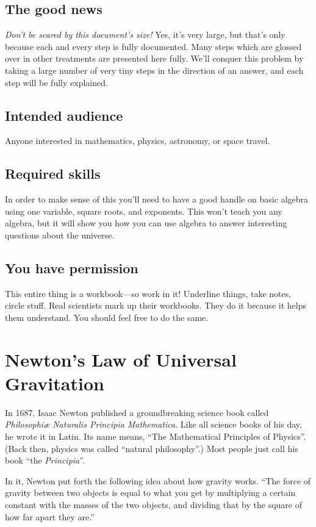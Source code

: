 \documentclass[10pt,letterpaper]{report}
\begin{document}
\subsection{The good news}
\textit{Don't be scared by this document's size!}  Yes, it's very
large, but that's only because each and every step is fully
documented.  Many steps which are glossed over in other treatments are
presented here fully.  We'll conquer this problem by taking a large
number of very tiny steps in the direction of an answer, and each step
will be fully explained.

\subsection{Intended audience}
Anyone interested in mathematics, physics, astronomy, or space
travel.

\subsection{Required skills}
In order to make sense of this you'll need to have a good handle on
basic algebra using one variable, square roots, and exponents.  This
won't teach you any algebra, but it will show you how you can use
algebra to answer interesting questions about the universe.

\subsection{You have permission}
This entire thing is a workbook---so work in it!  Underline things, take
notes, circle stuff.  Real scientists mark up their workbooks.  They
do it because it helps them understand.  You should feel free to do
the same.

\section{Newton's Law of Universal Gravitation}

In 1687, Isaac Newton published a groundbreaking science book called
\textit{Philosophi\ae{} Naturalis Principia
    Mathematica}.  Like all science books of his day, he wrote it in
Latin.  Its name means, ``The Mathematical Principles of
Physics''.  (Back then, physics was called ``natural
  philosophy''.)  Most people just call his book ``the
  \textit{Principia}''.

In it, Newton put forth the following idea about how gravity works.
``The force of gravity between two objects is equal to what
you get by multiplying a certain constant with the masses of the two
objects, and dividing that by the square of how far apart they
are.''
\end{document}
